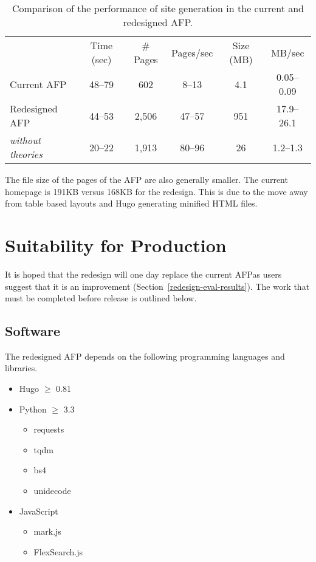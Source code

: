 \documentclass[bsc,frontabs,oneside,singlespacing,parskip,deptreport,logo]{infthesis}
\begin{document}

\begin{table}[h]
\centering
{}
\begin{tabularx}{\textwidth}{lccccc}
                             & Time (sec) & \# Pages & Pages/sec & Size (MB) & MB/sec \\
Current AFP                  & 48--79          & 602      & 8--13             & 4.1      & 0.05--0.09     \\
Redesigned AFP               & 44--53          & 2,506    & 47--57            & 951       & 17.9--26.1     \\
\emph{without theories} & 20--22          & 1,913     & 80--96            & 26        & 1.2--1.3      
\end{tabularx}
\caption{Comparison of the performance of site generation in the current and redesigned AFP. }
\label{tab:performance}
\end{table}

The file size of the pages of the AFP are also generally smaller. The current homepage is 191KB versus 168KB for the redesign. This is due to the move away from table based layouts and Hugo generating minified HTML files.

\cbend

\section{Suitability for Production}
\cbstart
It is hoped that the redesign will one day replace the current AFP\@ as users suggest that it is an improvement (Section~\ref{redesign-eval-results}). The work that must be completed before release is outlined below.
\cbend

\subsection{Software}

The redesigned AFP depends on the following programming languages and libraries. 

\begin{itemize}
    \item Hugo $\geq$ 0.81
    \item Python $\geq$ 3.3
    \begin{itemize}
        \item requests
        \item tqdm
        \item bs4
        \item unidecode
    \end{itemize}
    \item JavaScript
    \begin{itemize}
        \item mark.js
        \item FlexSearch.js
    \end{itemize}
\end{itemize}
\end{document}
